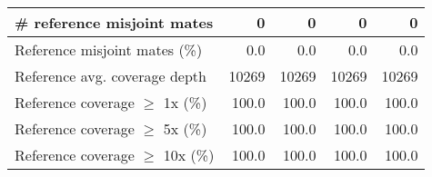 \documentclass[12pt,a4paper]{article}
\begin{document}
\begin{table}[ht]
\begin{center}
\begin{tabular}{|l*{4}{|r}|}
\# reference misjoint mates & 0 & 0 & 0 & 0 \\ \hline
Reference misjoint mates (\%) & 0.0 & 0.0 & 0.0 & 0.0 \\ \hline
Reference avg. coverage depth & 10269 & 10269 & 10269 & 10269 \\ \hline
Reference coverage $\geq$ 1x (\%) & 100.0 & 100.0 & 100.0 & 100.0 \\ \hline
Reference coverage $\geq$ 5x (\%) & 100.0 & 100.0 & 100.0 & 100.0 \\ \hline
Reference coverage $\geq$ 10x (\%) & 100.0 & 100.0 & 100.0 & 100.0 \\ \hline
\end{tabular}
\end{center}
\end{table}
\end{document}
